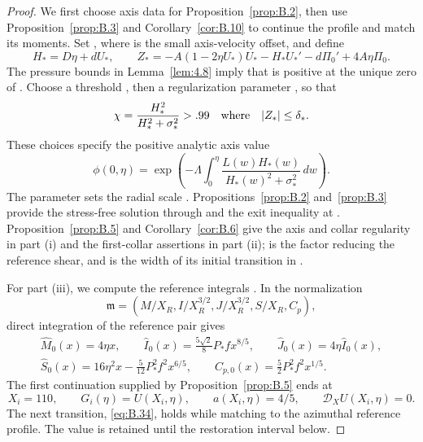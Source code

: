 \begin{proof}
We first choose axis data for Proposition~\ref{prop:B.2}, then use
Proposition~\ref{prop:B.3} and Corollary~\ref{cor:B.10} to continue the profile and match its
moments. Set , where
 is the small axis-velocity offset, and define
\[
H_*=D\eta+dU_*,
\qquad
Z_*=-A(1-2\eta U_*)U_*-H_*U_*'-d\Pi_0'+4A\eta\Pi_0.
\]
The pressure bounds in Lemma~\ref{lem:4.8} imply that
 is positive at the unique zero of
. Choose a threshold
, then a regularization parameter
, so that
\[
\chi=\frac{H_*^2}{H_*^2+\sigma_*^2}>.99
\quad\hbox{where}\quad \lvert Z_*\rvert\le\delta_*.
\]
These choices specify the positive analytic axis value
\[
\phi(0,\eta)=\exp\!\left(-\Lambda\int_0^{\eta}
\frac{L(w)H_*(w)}{H_*(w)^2+\sigma_*^2}\,dw\right).
\]
The parameter  sets the radial scale
. Propositions~\ref{prop:B.2} and~\ref{prop:B.3}
provide the stress-free solution through  and the exit inequality
 at
. Proposition~\ref{prop:B.5} and Corollary~\ref{cor:B.6}
give the axis and collar regularity in part (i) and the first-collar assertions in part (ii);
 is the factor reducing the reference shear, and
 is the width of its initial transition in
.

For part (iii), we compute the reference integrals
. In the normalization
\[
\widehat{\mathfrak m}=(M/X_R,I/X_R^{3/2},J/X_R^{3/2},S/X_R,C_p),
\]
direct integration of the reference pair gives
\begin{equation}
\begin{gathered}
\widehat M_0(x)=4\eta x,\qquad
\widehat I_0(x)=\frac{5\sqrt2}{8}P_*f x^{8/5},\qquad
\widehat J_0(x)=4\eta\widehat I_0(x),\\
\widehat S_0(x)=16\eta^2x-\frac5{12}P_*^2f^2x^{6/5},\qquad
C_{p,0}(x)=\frac52P_*^2f^2x^{1/5}.
\end{gathered}
\tag{4.34}\label{eq:4.34}
\end{equation}
The first continuation supplied by Proposition~\ref{prop:B.5} ends at
\[
X_i=110,\qquad G_i(\eta)=U(X_i,\eta),\qquad
a(X_i,\eta)=4/5,\qquad \mathcal D_XU(X_i,\eta)=0.
\]
The next transition, \eqref{eq:B.34}, holds
 while matching
 to the azimuthal reference profile. The value
 is retained until the restoration interval below.


\end{proof}
